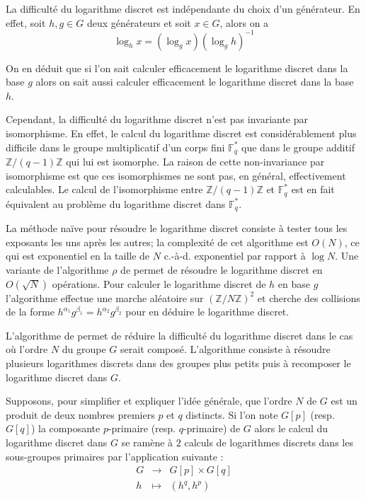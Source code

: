 \documentclass[a4paper,12pt]{article}
\theoremstyle{definition}
\theoremstyle{remark}
\numberwithin{equation}{section}
\begin{document}
La difficulté du logarithme discret est indépendante du choix d'un générateur. En effet, soit $h,g \in G$ deux générateurs et soit $x \in G$, alors on a
$$\log_h x = (\log_g x)(\log_g h)^{-1}$$

On en déduit que si l'on sait calculer efficacement le logarithme discret dans la base $g$ alors on sait aussi calculer efficacement le logarithme discret dans la base $h$.

Cependant, la difficulté du logarithme discret n'est pas invariante par isomorphisme. En effet, le calcul du logarithme discret est considérablement plus difficile dans le groupe multiplicatif d'un corps fini $\mathbb{F}^*_q$ que dans le groupe additif $\mathbb{Z}/(q-1)\mathbb{Z}$ qui lui est isomorphe. La raison de cette non-invariance par isomorphisme est que ces isomorphismes ne sont pas, en général, effectivement
calculables. Le calcul de l'isomorphisme entre $\mathbb{Z}/(q-1)\mathbb{Z}$ et $\mathbb{F}^*_q$ est en fait équivalent au problème du logarithme discret dans $\mathbb{F}_q^*$.

La méthode naïve pour résoudre le logarithme discret consiste à tester tous les exposants les uns après les autres; la complexité de cet algorithme est $O(N)$, ce qui est exponentiel en la taille de $N$ c.-à-d. exponentiel par rapport à $\log N$. Une variante de l'algorithme $\rho$ de \citet{pollard} permet de résoudre le logarithme discret en $O(\sqrt{N})$ opérations. Pour calculer le logarithme discret de $h$ en base $g$ l'algorithme effectue une marche aléatoire sur $(\mathbb{Z}/N\mathbb{Z})^2$ et cherche des collisions de la forme $h^{\alpha_1}g^{\beta_1} = h^{\alpha_2}g^{\beta_2}$ pour en déduire le logarithme discret.

L'algorithme de \citet{pohlig-hellman} permet de réduire la difficulté du logarithme discret dans le cas où l'ordre $N$ du groupe $G$ serait composé. L'algorithme consiste à résoudre plusieurs logarithmes discrets dans des groupes plus petits puis à recomposer le logarithme discret dans $G$.

Supposons, pour simplifier et expliquer l'idée générale, que l'ordre $N$ de $G$ est un produit de deux nombres premiers $p$ et $q$ distincts. Si l'on note $G[p]$ (resp. $G[q]$) la composante $p$-primaire (resp. $q$-primaire) de $G$ alors le calcul du logarithme discret dans $G$ se ramène à $2$ calculs de logarithmes discrets dans les sous-groupes primaires par l'application suivante :
\begin{equation*}
\begin{array}{lcl}
G & \longrightarrow & G[p] \times G[q] \\
h & \longmapsto & (h^q, h^p)
\end{array}
\end{equation*}
\end{document}
